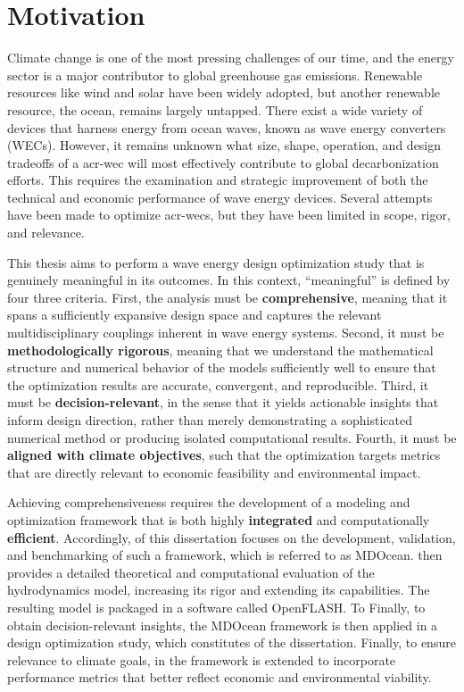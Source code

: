 \section{Motivation}
Climate change is one of the most pressing challenges of our time,
and the energy sector is a major contributor to global greenhouse gas emissions.
Renewable resources like wind and solar have been widely adopted, but another renewable resource, the ocean, remains largely untapped.
There exist a wide variety of devices that harness energy from ocean waves, known as wave energy converters (WECs).
However, it remains unknown what size, shape, operation, and design tradeoffs of a \gls{acr-wec} will most effectively contribute to global decarbonization efforts.
This requires the examination and strategic improvement of both the technical and economic performance of wave energy devices.
Several attempts have been made to optimize \glspl{acr-wec}, but they have been limited in scope, rigor, and relevance.

This thesis aims to perform a wave energy design optimization study that is genuinely meaningful in its outcomes.
In this context, ``meaningful'' is defined by 
\ifdefined\DECIDER
four
\else
three
\fi
criteria.
First, the analysis must be \textbf{comprehensive}, meaning that it spans a sufficiently expansive design space and captures the relevant multidisciplinary couplings inherent in wave energy systems.
Second, it must be \textbf{methodologically rigorous}, meaning that we understand the mathematical structure and numerical behavior of the models sufficiently well to ensure that the optimization results are accurate, convergent, and reproducible.
Third, it must be \textbf{decision-relevant}, in the sense that it yields actionable insights that inform design direction, rather than merely demonstrating a sophisticated numerical method or producing isolated computational results.
\ifdefined\DECIDER
  Fourth, it must be \textbf{aligned with climate objectives}, such that the optimization targets metrics that are directly relevant to economic feasibility and environmental impact.
\fi

Achieving comprehensiveness requires the development of a modeling and optimization framework that is both highly \textbf{integrated} and computationally \textbf{efficient}.
Accordingly,  of this dissertation focuses on the development, validation, and benchmarking of such a framework, which is referred to as MDOcean. 
 then provides a detailed theoretical and computational evaluation of the hydrodynamics model, increasing its rigor and extending its capabilities.
The resulting model is packaged in a software called OpenFLASH.
\ifdefined\DECIDER
  To
\else
  Finally, to
\fi
obtain decision-relevant insights, the MDOcean framework is then applied in a design optimization study, which constitutes  of the dissertation. 
\ifdefined\DECIDER
  Finally, to ensure relevance to climate goals, in  the framework is extended to incorporate performance metrics that better reflect economic and environmental viability.
\fi

